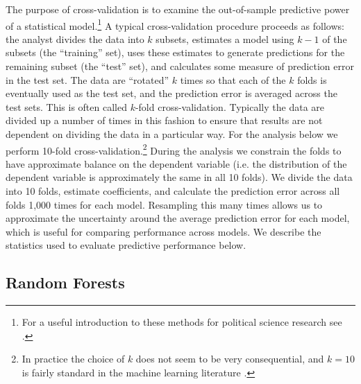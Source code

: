 \documentclass[12pt]{article}
\begin{document}
The purpose of cross-validation is to examine the out-of-sample predictive power of a statistical model.\footnote{For a useful introduction to these methods for political science research see \citet{LeeAhlquist2011}.} A typical cross-validation procedure proceeds as follows: the analyst divides the data into $k$ subsets, estimates a model using $k-1$ of the subsets (the ``training'' set), uses these estimates to generate predictions for the remaining subset (the ``test'' set), and calculates some measure of prediction error in the test set. The data are ``rotated'' $k$ times so that each of the $k$ folds is eventually used as the test set, and the prediction error is averaged across the test sets. This is often called $k$-fold cross-validation. Typically the data are divided up a number of times in this fashion to ensure that results are not dependent on dividing the data in a particular way. For the analysis below we perform 10-fold cross-validation.\footnote{In practice the choice of $k$ does not seem to be very consequential, and $k=10$ is fairly standard in the machine learning literature \citep[See, e.g.][]{HastieTibshiraniFriedman2008}.} During the analysis we constrain the folds to have approximate balance on the dependent variable (i.e. the distribution of the dependent variable is approximately the same in all 10 folds). We divide the data into 10 folds, estimate coefficients, and calculate the prediction error across all folds 1,000 times for each model.  Resampling this many times allows us to approximate the uncertainty around the average prediction error for each model, which is useful for comparing performance across models. We describe the statistics used to evaluate predictive performance below. 

\subsection{Random Forests}
\end{document}
